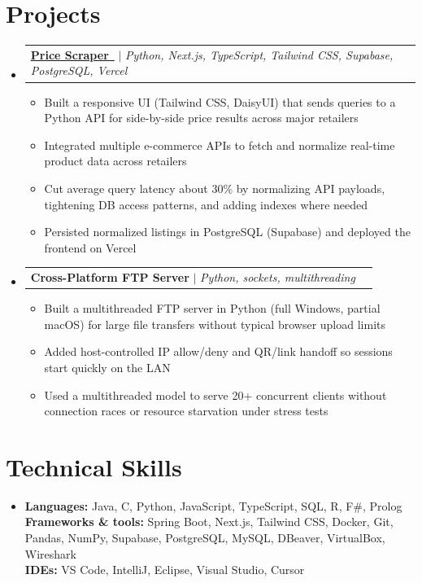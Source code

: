 \documentclass[letterpaper,11pt]{article}
\makeatletter
\newcommand{\resumeItem}[1]{
  \item\small{{#1 \vspace{-2pt}}}
}
\newcommand{\resumeProjectHeading}[2]{
  \item
    \begin{tabular*}{0.97\textwidth}{l@{\extracolsep{\fill}}r}
      \small#1 & #2 \\
    \end{tabular*}\vspace{-7pt}
}
\newcommand{\resumeSubHeadingListStart}{\begin{itemize}[leftmargin=0.15in, label={}]}
\newcommand{\resumeSubHeadingListEnd}{\end{itemize}}
\newcommand{\resumeItemListStart}{\begin{itemize}}
\newcommand{\resumeItemListEnd}{\end{itemize}\vspace{-5pt}}
\makeatother
\begin{document}
\section{Projects}
  \resumeSubHeadingListStart
    \resumeProjectHeading
      {{\href{https://price-scraper-ebon.vercel.app/}{\textbf{\underline{Price Scraper}}~\texttwemoji{link}}} $|$ \emph{Python, Next.js, TypeScript, Tailwind CSS, Supabase, PostgreSQL, Vercel}}{}
      \resumeItemListStart
        \resumeItem{Built a responsive UI (Tailwind CSS, DaisyUI) that sends queries to a Python API for side-by-side price results across major retailers}
        \resumeItem{Integrated multiple e-commerce APIs to fetch and normalize real-time product data across retailers}
        \resumeItem{Cut average query latency about 30\% by normalizing API payloads, tightening DB access patterns, and adding indexes where needed}
        \resumeItem{Persisted normalized listings in PostgreSQL (Supabase) and deployed the frontend on Vercel}
      \resumeItemListEnd

    \resumeProjectHeading
      {\textbf{Cross-Platform FTP Server} $|$ \emph{Python, sockets, multithreading}}{}
      \resumeItemListStart
        \resumeItem{Built a multithreaded FTP server in Python (full Windows, partial macOS) for large file transfers without typical browser upload limits}
        \resumeItem{Added host-controlled IP allow/deny and QR/link handoff so sessions start quickly on the LAN}
        \resumeItem{Used a multithreaded model to serve 20+ concurrent clients without connection races or resource starvation under stress tests}
      \resumeItemListEnd
  \resumeSubHeadingListEnd

\section{Technical Skills}
  \begin{itemize}[leftmargin=0.15in, label={}]
    \small
    \item{
      \textbf{Languages:} Java, C, Python, JavaScript, TypeScript, SQL, R, F\#, Prolog \\
      \textbf{Frameworks \& tools:} Spring Boot, Next.js, Tailwind CSS, Docker, Git, Pandas, NumPy, Supabase, PostgreSQL, MySQL, DBeaver, VirtualBox, Wireshark \\
      \textbf{IDEs:} VS Code, IntelliJ, Eclipse, Visual Studio, Cursor
    }
  \end{itemize}
\end{document}
